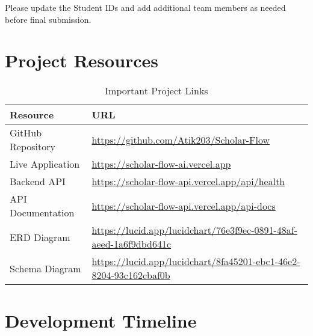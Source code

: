 \begin{warningbox}[Note]
Please update the Student IDs and add additional team members as needed before final submission.
\end{warningbox}

\section{Project Resources}
\label{sec:project-links}

\begin{table}[H]
\centering
\caption{Important Project Links}
\label{tab:project-links}
\begin{tabular}{@{}ll@{}}
\toprule
\textbf{Resource} & \textbf{URL} \\
\midrule
GitHub Repository & \url{https://github.com/Atik203/Scholar-Flow} \\
Live Application & \url{https://scholar-flow-ai.vercel.app} \\
Backend API & \url{https://scholar-flow-api.vercel.app/api/health} \\
API Documentation & \url{https://scholar-flow-api.vercel.app/api-docs} \\
ERD Diagram & \url{https://lucid.app/lucidchart/76e3f9ec-0891-48af-aeed-1a6f9dbd641c} \\
Schema Diagram & \url{https://lucid.app/lucidchart/8fa45201-ebc1-46e2-8204-93c162cbaf0b} \\
\bottomrule
\end{tabular}
\end{table}

\section{Development Timeline}
\label{sec:timeline}

